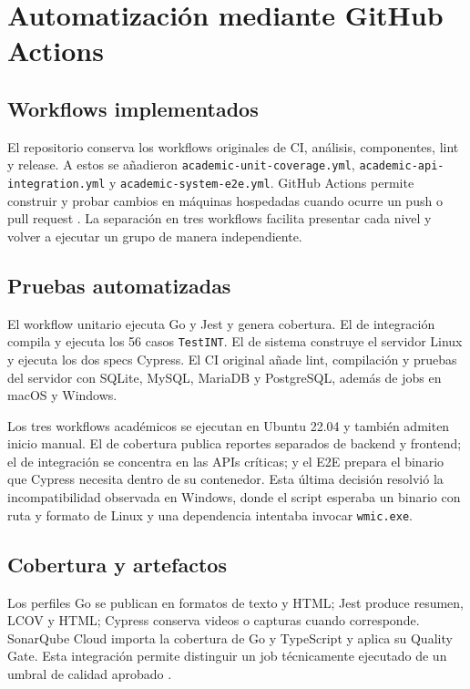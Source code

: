 \documentclass[conference]{IEEEtran}
\begin{document}
\section{Automatización mediante GitHub Actions}

\subsection{Workflows implementados}
El repositorio conserva los workflows originales de CI, análisis, componentes, lint y release. A estos se añadieron \texttt{academic-unit-coverage.yml}, \texttt{academic-api-integration.yml} y \texttt{academic-system-e2e.yml}. GitHub Actions permite construir y probar cambios en máquinas hospedadas cuando ocurre un push o pull request \cite{githubActions}. La separación en tres workflows facilita presentar cada nivel y volver a ejecutar un grupo de manera independiente.
\vspace{\baselineskip}

\subsection{Pruebas automatizadas}
El workflow unitario ejecuta Go y Jest y genera cobertura. El de integración compila y ejecuta los 56 casos \texttt{TestINT}. El de sistema construye el servidor Linux y ejecuta los dos specs Cypress. El CI original añade lint, compilación y pruebas del servidor con SQLite, MySQL, MariaDB y PostgreSQL, además de jobs en macOS y Windows.

Los tres workflows académicos se ejecutan en Ubuntu 22.04 y también admiten inicio manual. El de cobertura publica reportes separados de backend y frontend; el de integración se concentra en las APIs críticas; y el E2E prepara el binario que Cypress necesita dentro de su contenedor. Esta última decisión resolvió la incompatibilidad observada en Windows, donde el script esperaba un binario con ruta y formato de Linux y una dependencia intentaba invocar \texttt{wmic.exe}.
\vspace{\baselineskip}

\subsection{Cobertura y artefactos}
Los perfiles Go se publican en formatos de texto y HTML; Jest produce resumen, LCOV y HTML; Cypress conserva videos o capturas cuando corresponde. SonarQube Cloud importa la cobertura de Go y TypeScript y aplica su Quality Gate. Esta integración permite distinguir un job técnicamente ejecutado de un umbral de calidad aprobado \cite{sonarGates}.
\vspace{\baselineskip}
\end{document}
